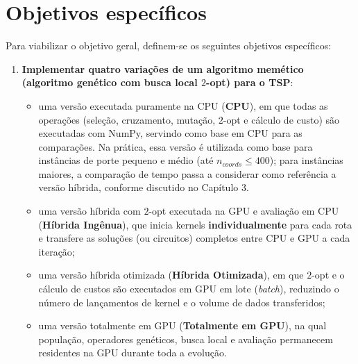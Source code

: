 \section{Objetivos específicos}\label{sec-14-objetivos-especificos}

Para viabilizar o objetivo geral, definem-se os seguintes objetivos específicos:

\begin{enumerate}
      \def\labelenumi{\arabic{enumi}.}
      \item
            \textbf{Implementar quatro variações de um algoritmo memético (algoritmo genético com busca local \(2\)-opt) para o TSP}:

            \begin{itemize}
                  \tightlist
                  \item
                        uma versão executada puramente na CPU (\textbf{CPU}), em que todas as operações (seleção, cruzamento, mutação, \(2\)-opt e cálculo de custo) são executadas com NumPy, servindo como base em CPU para as comparações.
                        Na prática, essa versão é utilizada como base para instâncias de porte pequeno e médio (até \(n_{coords} \leq 400\)); para instâncias maiores, a comparação de tempo passa a considerar como referência a versão híbrida, conforme discutido no Capítulo 3.
                  \item
                        uma versão híbrida com \(2\)-opt executada na GPU e avaliação em CPU (\textbf{Híbrida Ingênua}), que inicia kernels \textbf{individualmente} para cada rota e transfere as soluções (ou circuitos) completos entre CPU e GPU a cada iteração;
                  \item
                        uma versão híbrida otimizada (\textbf{Híbrida Otimizada}), em que \(2\)-opt e o cálculo de custos são executados em GPU em lote (\emph{batch}), reduzindo o número de lançamentos de kernel e o volume de dados transferidos;
                  \item
                        uma versão totalmente em GPU (\textbf{Totalmente em GPU}), na qual população, operadores genéticos, busca local e avaliação permanecem residentes na GPU durante toda a evolução.
            \end{itemize}


\end{enumerate}
